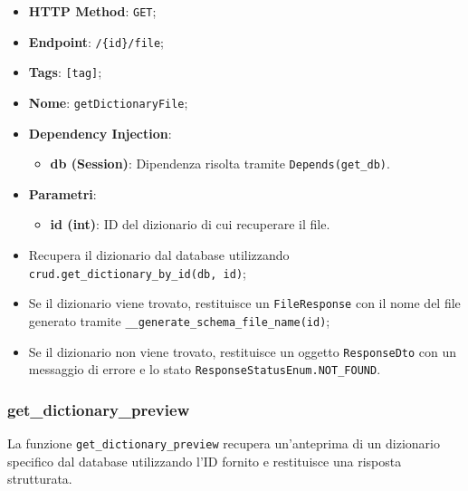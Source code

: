 \begin{itemize}
\item \textbf{HTTP Method}: \texttt{GET};
\item \textbf{Endpoint}: \texttt{/\{id\}/file};
\item \textbf{Tags}: \texttt{[tag]};
\item \textbf{Nome}: \texttt{getDictionaryFile};
\item \textbf{Dependency Injection}:
\begin{itemize}
\item \textbf{db (Session)}: Dipendenza risolta tramite \texttt{Depends(get\_db)}.
\end{itemize}
\item \textbf{Parametri}:
\begin{itemize}
\item \textbf{id (int)}: ID del dizionario di cui recuperare il file.
\end{itemize}
\end{itemize}

\begin{itemize}
\item Recupera il dizionario dal database utilizzando \texttt{crud.get\_dictionary\_by\_id(db, id)};
\item Se il dizionario viene trovato, restituisce un \texttt{FileResponse} con il nome del file generato tramite \texttt{\_\_generate\_schema\_file\_name(id)};
\item Se il dizionario non viene trovato, restituisce un oggetto \texttt{ResponseDto} con un messaggio di errore e lo stato \texttt{ResponseStatusEnum.NOT\_FOUND}.
\end{itemize}

\subsubsection{get\_dictionary\_preview}

\par La funzione \texttt{get\_dictionary\_preview} recupera un'anteprima di un dizionario specifico dal database utilizzando l'ID fornito e restituisce una risposta strutturata.

